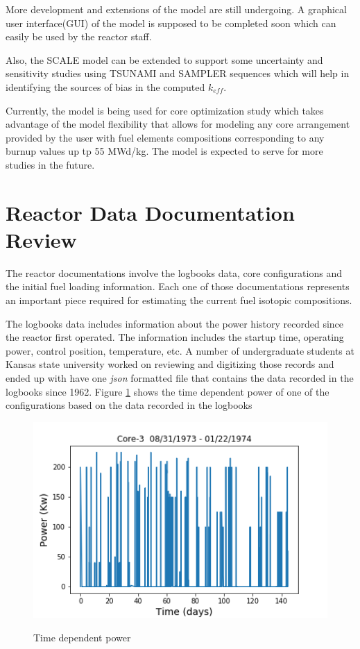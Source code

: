 \documentclass[review,number,sort&compress,12pt]{elsarticle}
\begin{document}
More development and extensions of the model are still undergoing. A graphical user interface(GUI) of the model is supposed to be completed soon which can easily be used by the reactor staff.

Also, the SCALE model can be extended to support some uncertainty and sensitivity studies using TSUNAMI and SAMPLER sequences which will help in identifying the sources of bias in the computed $k_{eff}$.

Currently, the model is being used for core optimization study which takes advantage of the model flexibility that allows for modeling any core arrangement provided by the user with fuel elements compositions corresponding to any burnup values up tp 55 MWd/kg. The model is expected to serve for more studies in the future.

\section{Reactor Data Documentation Review}
The reactor documentations involve the logbooks data, core configurations and the initial fuel loading information.
Each one of those documentations represents an important piece required for estimating the current fuel isotopic compositions.

The logbooks data includes information about the power history recorded since the reactor first operated. The information includes the startup time, operating power, control position, temperature, etc.
A number of undergraduate students at Kansas state university worked on reviewing and digitizing those records and ended up with have one \emph{json} formatted file that contains the data recorded in the logbooks since 1962. 
Figure \ref{fig:core3_power} shows the time dependent power of one of the configurations based on the data recorded in the logbooks

\begin{figure}[h]
\centering
\includegraphics[scale=0.8]{core3.png}\\
\caption{Time dependent power}
\label{fig:core3_power}
\end{figure}
\end{document}
